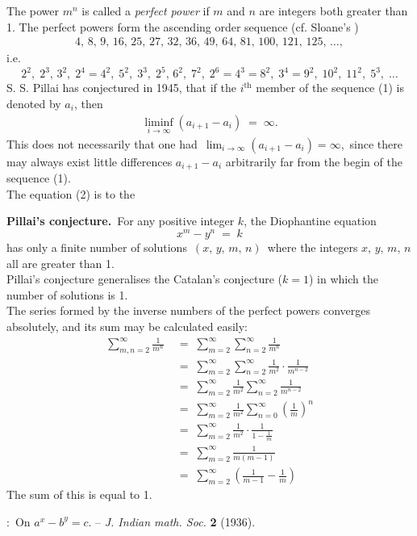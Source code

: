 \documentclass[12pt]{article}
\theoremstyle{definition}
\begin{document}

The power $m^n$ is called a \emph{perfect power} if $m$ and $n$ are integers both greater than 1.  The perfect powers form the ascending order sequence (cf. Sloane's )
\begin{align}
4,\,8,\,9,\,16,\,25,\,27,\,32,\,36,\,49,\,64,\,81,\,100,\,121,\,125,\,\ldots,
\end{align}
i.e.
$$2^2,\;2^3,\,3^2,\;2^4 = 4^2,\;5^2,\;3^3,\;2^5,\,6^2,\;7^2,\;2^6 = 4^3 = 8^2,\;3^4 = 9^2,\;10^2,\;11^2,\;5^3,\;\ldots$$
S. S. Pillai has conjectured in 1945, that if the $i^{\mathrm{th}}$ member of the sequence (1) is denoted by $a_i$, then 
\begin{align}
\liminf_{i\to\infty}(a_{i+1}\!-\!a_i) \;=\; \infty.
\end{align}
This does not necessarily  that one had\, $\lim_{i\to\infty}(a_{i+1}\!-\!a_i) = \infty$,\, since there may always exist little differences $a_{i+1}\!-\!a_i$ arbitrarily far from the begin of the sequence (1).\\

The equation (2) is  to the

\textbf{Pillai's conjecture.}\, For any  positive integer $k$, the Diophantine equation
                                        $$x^m\!-\!y^n \;=\; k$$
has only a finite number of  solutions \,$(x,\,y,\,m,\,n)$\, where the integers $x,\,y,\,m,\,n$ all are greater than 1. \\

Pillai's conjecture generalises the Catalan's conjecture ($k = 1$) in which the number of solutions is 1.\\


The series formed by the inverse numbers of the perfect powers converges absolutely, and its sum may be calculated easily:
\begin{align*}
\sum_{m,n=2}^\infty\frac{1}{m^n} &\;=\; \sum_{m=2}^\infty\sum_{n=2}^\infty\frac{1}{m^n}\\
&\;=\; \sum_{m=2}^\infty\sum_{n=2}^\infty\frac{1}{m^2}\!\cdot\!\frac{1}{m^{n-2}}\\
&\;=\; \sum_{m=2}^\infty\frac{1}{m^2}\sum_{n=2}^\infty\frac{1}{m^{n-2}}\\
&\;=\; \sum_{m=2}^\infty\frac{1}{m^2}\sum_{n=0}^\infty\left(\frac{1}{m}\right)^{\!n}\\
&\;=\; \sum_{m=2}^\infty\frac{1}{m^2}\!\cdot\!\frac{1}{1\!-\!\frac{1}{m}}\\
&\;=\; \sum_{m=2}^\infty\frac{1}{m(m\!-\!1)}\\
&\;=\; \sum_{m=2}^\infty\left(\frac{1}{m\!-\!1}-\frac{1}{m}\right)
\end{align*}
The sum of this  is equal to 1.



\begin{thebibliography}{8}
:\, On $a^x\!-\!b^y = c$.\; -- \emph{J. Indian math. Soc.} \textbf{2} (1936).
\end{thebibliography}












\end{document}
